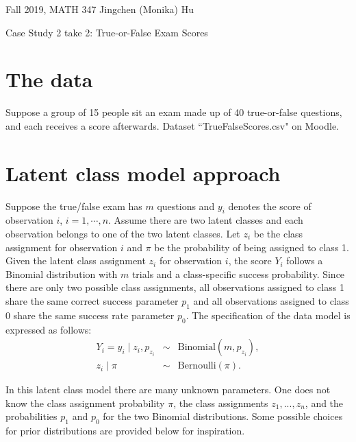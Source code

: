 \documentclass[11pt]{article}
\begin{document}
\enlargethispage{\baselineskip}

Fall 2019, MATH 347 \hfill Jingchen (Monika) Hu\\

\begin{center}
{\huge Case Study 2 take 2: True-or-False Exam Scores}	
\end{center}
\vspace{0.5cm}


\section{The data} 

Suppose a group of 15 people sit an exam made up of 40 true-or-false questions, and each receives a score afterwards. Dataset ``TrueFalseScores.csv" on Moodle.

\section{Latent class model approach} 

Suppose the true/false exam has $m$ questions and  $y_i$ denotes the score of observation $i$,  $i = 1, \cdots, n$.  Assume there are two latent classes and each observation belongs to one of the two latent classes.   Let $z_i$ be the class assignment for observation $i$ and $\pi$ be the probability of being assigned to class 1.
Given the latent class assignment $z_i$ for observation $i$, the score $Y_i$ follows a Binomial distribution with $m$ trials and a class-specific success probability.  Since there are only two possible class assignments, all observations assigned to class 1 share the same correct success parameter $p_1$ and all observations assigned to class 0 share the same success rate parameter $p_0$. 
The specification of the data model is expressed as follows:
\begin{eqnarray}
Y_i = y_i \mid z_i, p_{z_i} &\sim& \textrm{Binomial}(m, p_{z_i}), \\
\label{eq:Bern2} z_i \mid \pi &\sim& \textrm{Bernoulli}(\pi). 
\end{eqnarray}


In this latent class model there are many unknown parameters.  One does not know the class assignment probability $\pi$, the class assignments $z_1, ..., z_n$, and the probabilities $p_1$ and $p_0$ for the two Binomial distributions.  Some possible choices for prior distributions are provided below for inspiration.
\end{document}
